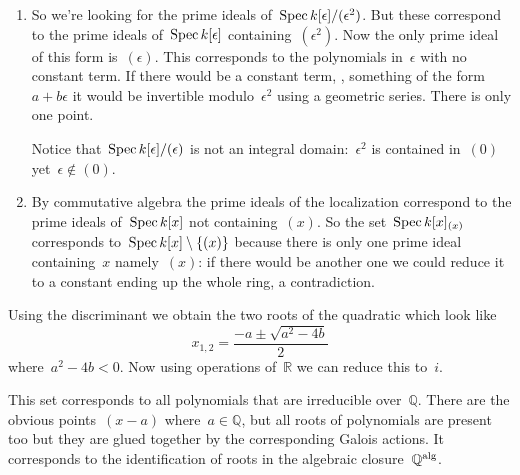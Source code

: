 \begin{exercise}
  \label{exercise:42a}
  \begin{enumerate}
    \item\label{enumerate:42a-a} So we're looking for the prime ideals of~$\operatorname{Spec} k[\epsilon]/(\epsilon^2)$. But these correspond to the prime ideals of~$\operatorname{Spec} k[\epsilon]$ containing~$(\epsilon^2)$. Now the only prime ideal of this form is~$(\epsilon)$. This corresponds to the polynomials in~$\epsilon$ with no constant term. If there would be a constant term, \ie, something of the form~$a+b\epsilon$ it would be invertible modulo~$\epsilon^2$ using a geometric series. There is only one point.

      Notice that~$\operatorname{Spec} k[\epsilon]/(\epsilon)$ is not an integral domain:~$\epsilon^2$ is contained in~$(0)$ yet~$\epsilon\notin(0)$.

    \item\label{enumerate:42a-b} By commutative algebra the prime ideals of the localization correspond to the prime ideals of~$\operatorname{Spec} k[x]$ not containing~$(x)$. So the set~$\operatorname{Spec} k[x]_{(x)}$ corresponds to~$\operatorname{Spec} k[x]\setminus\left\{ (x) \right\}$ because there is only one prime ideal containing~$x$ namely~$(x)$: if there would be another one we could reduce it to a constant ending up the whole ring, a contradiction.
  \end{enumerate}
\end{exercise}

\begin{exercise}
  Using the discriminant we obtain the two roots of the quadratic which look like
  \begin{equation}
    x_{1,2}=\frac{-a\pm\sqrt{a^2-4b}}{2}
  \end{equation}
  where~$a^2-4b<0$. Now using operations of~$\mathbb{R}$ we can reduce this to~$i$.
\end{exercise}

\begin{exercise}
  This set corresponds to all polynomials that are irreducible over~$\mathbb{Q}$. There are the obvious points~$(x-a)$ where~$a\in\mathbb{Q}$, but all roots of polynomials are present too but they are glued together by the corresponding Galois actions. It corresponds to the identification of roots in the algebraic closure~$\mathbb{Q}^{\operatorname{alg}}$.
\end{exercise}

